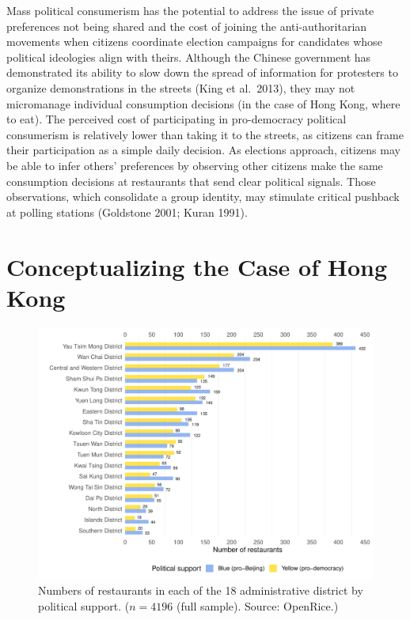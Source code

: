 \documentclass[letterpaper, 12pt]{article}
\begin{document}
Mass political consumerism has the potential to address the issue of private preferences not being shared and the cost of joining the anti-authoritarian movements when citizens coordinate election campaigns for candidates whose political ideologies align with theirs. Although the Chinese government has demonstrated its ability to slow down the spread of information for protesters to organize demonstrations in the streets (King et al.\ 2013), they may not micromanage individual consumption decisions (in the case of Hong Kong, where to eat). The perceived cost of participating in pro-democracy political consumerism is relatively lower than taking it to the streets, as citizens can frame their participation as a simple daily decision. As elections approach, citizens may be able to infer others' preferences by observing other citizens make the same consumption decisions at restaurants that send clear political signals. Those observations, which consolidate a group identity, may stimulate critical pushback at polling stations (Goldstone 2001; Kuran 1991). 



\section{Conceptualizing the Case of Hong Kong}
\begin{figure}[h!]
\centering
        \includegraphics[scale=0.8]{Visuals/bar_restaurant_by_district.pdf} 
        \caption{Numbers of restaurants in each of the 18 administrative district by political support. ($n = 4196$ (full sample). Source: OpenRice.)}
        \label{fig: openrice}
\end{figure}
\end{document}

